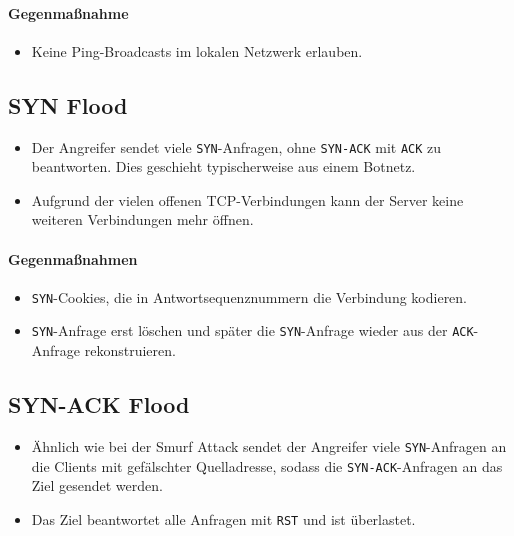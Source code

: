 	        \paragraph{Gegenmaßnahme}
		        \begin{itemize}
		        	\item Keine Ping-Broadcasts im lokalen Netzwerk erlauben.
		        \end{itemize}

        \subsection{SYN Flood}
            \begin{itemize}
            	\item Der Angreifer sendet viele \texttt{SYN}-Anfragen, ohne \texttt{SYN-ACK} mit \texttt{ACK} zu beantworten. Dies geschieht typischerweise aus einem Botnetz.
            	\item Aufgrund der vielen offenen TCP-Verbindungen kann der Server keine weiteren Verbindungen mehr öffnen.
            \end{itemize}
        
	        \paragraph{Gegenmaßnahmen}
		        \begin{itemize}
		        	\item \texttt{SYN}-Cookies, die in Antwortsequenznummern die Verbindung kodieren.
		        	\item \texttt{SYN}-Anfrage erst löschen und später die \texttt{SYN}-Anfrage wieder aus der \texttt{ACK}-Anfrage rekonstruieren.
		        \end{itemize}

        \subsection{SYN-ACK Flood}
            \begin{itemize}
            	\item Ähnlich wie bei der Smurf Attack sendet der Angreifer viele \texttt{SYN}-Anfragen an die Clients mit gefälschter Quelladresse, sodass die \texttt{SYN-ACK}-Anfragen an das Ziel gesendet werden.
            	\item Das Ziel beantwortet alle Anfragen mit \texttt{RST} und ist überlastet.
            \end{itemize}
        
